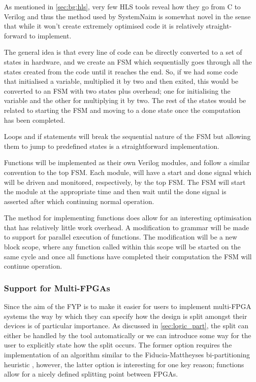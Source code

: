 As mentioned in \autoref{sec:bg:hls}, very few HLS tools reveal how they go from C to Verilog and thus the method used by SystemNaim is somewhat novel in the sense that while it won't create extremely optimised code it is relatively straight-forward to implement. 

The general idea is that every line of code can be directly converted to a set of states in hardware, and we create an FSM which sequentially goes through all the states created from the code until it reaches the end. So, if we had some code that initialised a variable, multiplied it by two and then exited, this would be converted to an FSM with two states plus overhead; one for initialising the variable and the other for multiplying it by two. The rest of the states would be related to starting the FSM and moving to a done state once the computation has been completed.

Loops and if statements will break the sequential nature of the FSM but allowing them to jump to predefined states is a straightforward implementation.

Functions will be implemented as their own Verilog modules, and follow a similar convention to the top FSM. Each module, will have a start and done signal which will be driven and monitored, respectively, by the top FSM. The FSM will start the module at the appropriate time and then wait until the done signal is asserted after which continuing normal operation.

The method for implementing functions does allow for an interesting optimisation that has relatively little work overhead. A modification to grammar will be made to support for parallel execution of functions. The modification will be a new block scope, where any function called within this scope will be started on the same cycle and once all functions have completed their computation the FSM will continue operation.

\subsubsection{Support for Multi-FPGAs}

Since the aim of the FYP is to make it easier for users to implement multi-FPGA systems the way by which they can specify how the design is split amongst their devices is of particular importance. As discussed in \autoref{sec:logic_part}, the split can either be handled by the tool automatically or we can introduce some way for the user to explicitly state how the split occurs. The former option requires the implementation of an algorithm similar to the Fiducia-Mattheyses bi-partitioning heuristic \cite{1585498}, however, the latter option is interesting for one key reason; functions allow for a nicely defined splitting point between FPGAs. 

